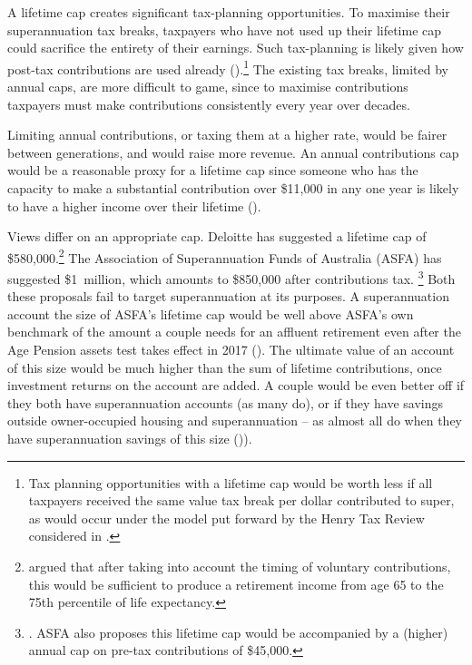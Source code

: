 A lifetime cap creates significant tax-planning opportunities. To maximise their superannuation tax breaks, taxpayers who have not used up their lifetime cap could sacrifice the entirety of their earnings. Such tax-planning is likely given how post-tax contributions are used already ().\footnote{Tax planning opportunities with a lifetime cap would be worth less if all taxpayers received the same value tax break per dollar contributed to super, as would occur under the model put forward by the Henry Tax Review considered in .}  The existing tax breaks, limited by annual caps, are more difficult to game, since to maximise contributions taxpayers must make contributions consistently every year over decades.  

Limiting annual contributions, or taxing them at a higher rate, would be fairer between generations, and would raise more revenue. An annual contributions cap would be a reasonable proxy for a lifetime cap since someone who has the capacity to make a substantial contribution over \$11,000 in any one year is likely to have a higher income over their lifetime ().

Views differ on an appropriate cap. Deloitte has suggested a lifetime cap of \$580,000.\footnote{\textcite[][18]{Deloitte2015DynamicsofAusSuper} argued that after taking into account the timing of voluntary contributions, this would be sufficient to produce a retirement income from age 65 to the 75th percentile of life expectancy.} The Association of Superannuation Funds of Australia (ASFA) has suggested \$1~million, which amounts to \$850,000 after contributions tax.%
\footnote{\textcite[][39]{ASFA2015TreasurySubmission}. ASFA also proposes this lifetime cap would be accompanied by a (higher) annual cap on pre-tax contributions of \$45,000.}
Both these proposals fail to target superannuation at its purposes. A superannuation account the size of ASFA’s lifetime cap would be well above ASFA’s own benchmark of the amount a couple needs for an affluent retirement even after the Age Pension assets test takes effect in 2017 (). The ultimate value of an account of this size would be much higher than the sum of lifetime contributions, once investment returns on the account are added. A couple would be even better off if they both have superannuation accounts (as many do), or if they have savings outside owner-occupied housing and superannuation – as almost all do when they have superannuation savings of this size ()). 

